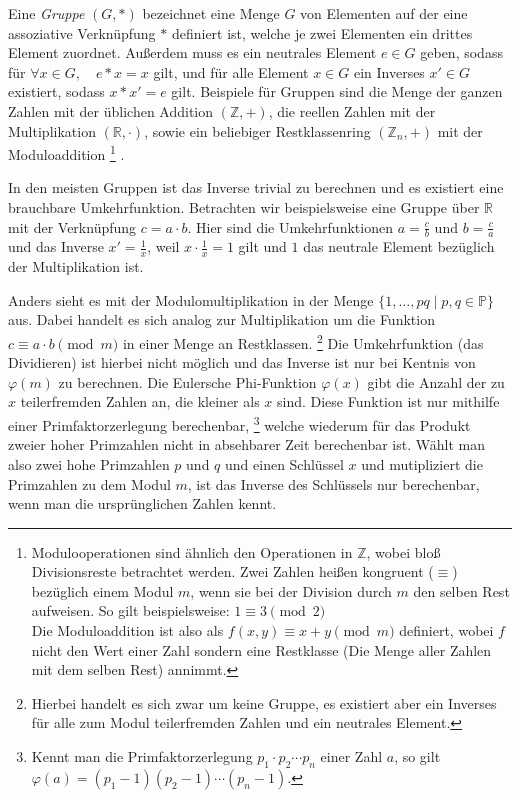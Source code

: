 Eine \emph{Gruppe} $(G,*)$ bezeichnet eine Menge $G$ von Elementen auf der eine assoziative Verknüpfung $*$ definiert ist, welche je zwei Elementen ein drittes Element zuordnet.
Außerdem muss es ein neutrales Element $e \in G$ geben, sodass für $\forall x \in G, \quad e*x=x$ gilt, und für alle Element $x \in G$ ein Inverses $x' \in G$ existiert, sodass $x*x'=e$ gilt.
Beispiele für Gruppen sind die Menge der ganzen Zahlen mit der üblichen Addition $(\mathbb{Z}, +)$, die reellen Zahlen mit der Multiplikation $(\mathbb{R}, \cdot)$, sowie ein beliebiger Restklassenring $(\mathbb{Z}_n, +)$ mit der Moduloaddition%
\footnote{Modulooperationen sind ähnlich den Operationen in $\mathbb{Z}$, wobei bloß Divisionsreste betrachtet werden.
Zwei Zahlen heißen kongruent ($\equiv$) bezüglich einem Modul $m$, wenn sie bei der Division durch $m$ den selben Rest aufweisen.
So gilt beispielsweise: $1 \equiv 3 \pmod{2}$ \\
Die Moduloaddition ist also als $f(x,y) \equiv x+y \pmod{m}$ definiert, wobei $f$ nicht den Wert einer Zahl sondern eine Restklasse (Die Menge aller Zahlen mit dem selben Rest) annimmt.}%
.

In den meisten Gruppen ist das Inverse trivial zu berechnen und es existiert eine brauchbare Umkehrfunktion.
Betrachten wir beispielsweise eine Gruppe über $\mathbb{R}$ mit der Verknüpfung $c = a \cdot b$.
Hier sind die Umkehrfunktionen $a = \frac{c}{b}$ und $b = \frac{c}{a}$ und das Inverse $x'=\frac{1}{x}$, weil $x \cdot \frac{1}{x} = 1$ gilt und $1$ das neutrale Element bezüglich der Multiplikation ist.

Anders sieht es mit der Modulomultiplikation in der Menge $\{ 1, \dotsc, pq \mid p,q \in \mathbb{P}\}$ aus.
Dabei handelt es sich analog zur Multiplikation um die Funktion $c \equiv a \cdot b \pmod{m}$ in einer Menge an Restklassen.%
\footnote{Hierbei handelt es sich zwar um keine Gruppe, es existiert aber ein Inverses für alle zum Modul teilerfremden Zahlen und ein neutrales Element. }
Die Umkehrfunktion (das Dividieren) ist hierbei nicht möglich und das Inverse ist nur bei Kentnis von $\varphi(m)$ zu berechnen.
Die Eulersche Phi-Funktion $\varphi(x)$ gibt die Anzahl der zu $x$ teilerfremden Zahlen an, die kleiner als $x$ sind.
Diese Funktion ist nur mithilfe einer Primfaktorzerlegung berechenbar,%
\footnote{Kennt man die Primfaktorzerlegung $p_1 \cdot p_2 \dotsm p_n$ einer Zahl $a$, so gilt $\varphi (a) = (p_1-1) (p_2-1) \dotsm (p_n-1)$.}
welche wiederum für das Produkt zweier hoher Primzahlen nicht in absehbarer Zeit berechenbar ist.
Wählt man also zwei hohe Primzahlen $p$ und $q$ und einen Schlüssel $x$ und mutipliziert die Primzahlen zu dem Modul $m$, ist das Inverse des Schlüssels nur berechenbar, wenn man die ursprünglichen Zahlen kennt.

